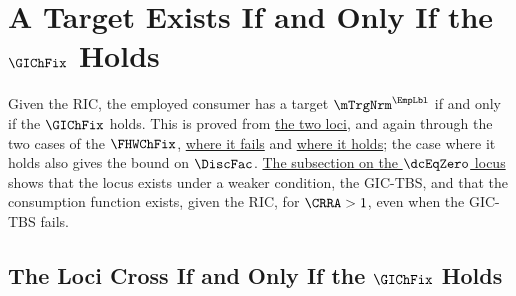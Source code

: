\documentclass{econark}
\begin{document}
\section{A Target Exists If and Only If the $\GIChFix$ Holds}\label{sec:mTargExists}

Given the RIC, the employed consumer has a target $\mTrgNrm^{\EmpLbl}$ if and only if the $\GIChFix$ holds.  This is proved from \hyperref[sec:TractableBufferStock-LociCross]{the two loci}, and again through the two cases of the $\FHWChFix$, \hyperref[sec:TractableBufferStock-TargetWhenFHWChFixFails]{where it fails} and \hyperref[sec:TractableBufferStock-TargetWhenFHWChFixHolds]{where it holds}; the case where it holds also gives the bound on $\DiscFac$.  \hyperref[sec:TractableBufferStock-cLocusExists]{The subsection on the $\dcEqZero$ locus} shows that the locus exists under a weaker condition, the GIC-TBS, and that the consumption function exists, given the RIC, for $\CRRA > 1$, even when the GIC-TBS fails.

\subsection{The Loci Cross If and Only If the $\GIChFix$ Holds}\label{sec:TractableBufferStock-LociCross}
 
\end{document}
